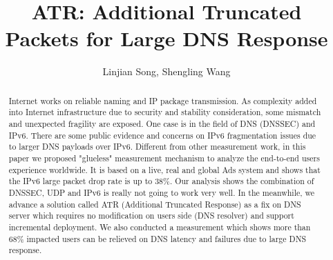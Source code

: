 \documentclass[sigconf]{acmart}
\begin{document}
\title{ATR: Additional Truncated Packets for Large DNS Response }


\author{Linjian Song, Shengling Wang}

\renewcommand{\shortauthors}{X.et al.}

\begin{abstract}
   Internet works on reliable naming and IP package transmission. 
   As complexity added into Internet infrastructure due to security 
   and stability consideration, some mismatch and unexpected fragility 
   are exposed. One case is in the field of DNS (DNSSEC) and IPv6. 
   There are some public evidence and concerns on IPv6 fragmentation 
   issues due to larger DNS payloads over IPv6. Different from other 
   measurement work, in this paper we proposed "glueless" measurement 
   mechanism to analyze the end-to-end users experience worldwide. 
   It is based on a live, real and global Ads system and shows that 
   the IPv6 large packet drop rate is up to 38\%. Our analysis shows 
   the combination of DNSSEC, UDP and IPv6 is really not going to work 
   very well. In the meanwhile, we advance a solution called ATR 
   (Additional Truncated Response) as a fix on DNS server which 
   requires no modification on users side (DNS resolver) and support 
   incremental deployment. We also conducted a measurement which shows 
   more than 68\% impacted users can be relieved on DNS latency and 
   failures due to large DNS response.
\end{abstract}

\maketitle





\end{document}
